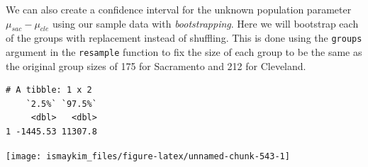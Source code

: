 \documentclass[12pt, krantz2,]{krantz}
\makeatletter
\newenvironment{Shaded}{\begin{snugshade}}{\end{snugshade}}
\newcommand{\DataTypeTok}[1]{\textcolor[rgb]{0.27,0.27,0.27}{#1}}
\newcommand{\DecValTok}[1]{\textcolor[rgb]{0.06,0.06,0.06}{#1}}
\newcommand{\KeywordTok}[1]{\textcolor[rgb]{0.27,0.27,0.27}{\textbf{#1}}}
\newcommand{\NormalTok}[1]{#1}
\newcommand{\OperatorTok}[1]{\textcolor[rgb]{0.43,0.43,0.43}{\textbf{#1}}}
\newcommand{\StringTok}[1]{\textcolor[rgb]{0.5,0.5,0.5}{#1}}
\newenvironment{kframe}{%
\medskip{}
\setlength{\fboxsep}{.8em}
 \def\at@end@of@kframe{}%
 \ifinner\ifhmode%
  \def\at@end@of@kframe{\end{minipage}}%
  \begin{minipage}{\columnwidth}%
 \fi\fi%
 \def\FrameCommand##1{\hskip\@totalleftmargin \hskip-\fboxsep
 \colorbox{shadecolor}{##1}\hskip-\fboxsep
     \hskip-\linewidth \hskip-\@totalleftmargin \hskip\columnwidth}%
 \MakeFramed {\advance\hsize-\width
   \@totalleftmargin\z@ \linewidth\hsize
   \@setminipage}}%
 {\par\unskip\endMakeFramed%
 \at@end@of@kframe}
\renewenvironment{Shaded}{\begin{kframe}}{\end{kframe}}
\makeatother
\begin{document}
We can also create a confidence interval for the unknown population parameter \(\mu_{sac} - \mu_{cle}\) using our sample data with \emph{bootstrapping}. Here we will bootstrap each of the groups with replacement instead of shuffling. This is done using the \texttt{groups}
argument in the \texttt{resample} function to fix the size of each group to
be the same as the original group sizes of 175 for Sacramento and 212 for Cleveland.

\begin{Shaded}
\end{Shaded}

\begin{Shaded}
\end{Shaded}

\begin{verbatim}
# A tibble: 1 x 2
    `2.5%` `97.5%`
     <dbl>   <dbl>
1 -1445.53 11307.8
\end{verbatim}

\begin{Shaded}
\end{Shaded}

\begin{center}\texttt{[image: ismaykim\_files/figure-latex/unnamed-chunk-543-1]} \end{center}
\end{document}
